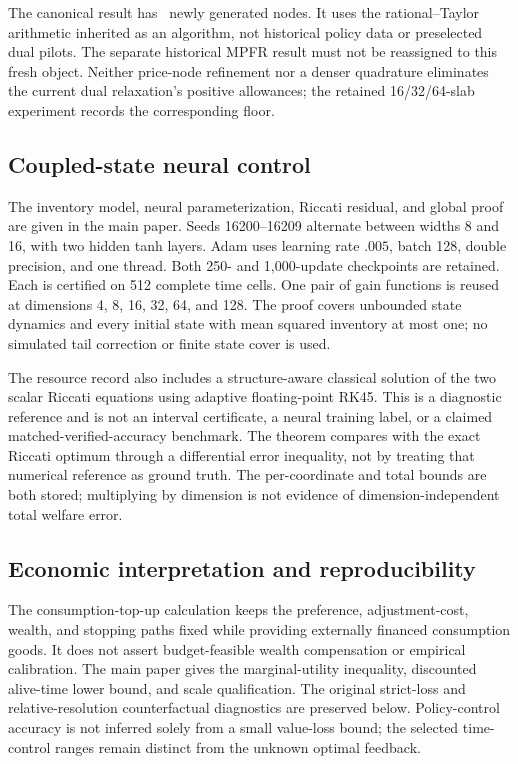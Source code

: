 The canonical result has \RFreshNodes\ newly generated nodes. It uses the rational--Taylor arithmetic inherited as an algorithm, not historical policy data or preselected dual pilots. The separate historical MPFR result must not be reassigned to this fresh object. Neither price-node refinement nor a denser quadrature eliminates the current dual relaxation's positive allowances; the retained 16/32/64-slab experiment records the corresponding floor.

\subsection{Coupled-state neural control}
The inventory model, neural parameterization, Riccati residual, and global proof are given in the main paper. Seeds 16200--16209 alternate between widths 8 and 16, with two hidden tanh layers. Adam uses learning rate $.005$, batch 128, double precision, and one thread. Both 250- and 1,000-update checkpoints are retained. Each is certified on 512 complete time cells. One pair of gain functions is reused at dimensions 4, 8, 16, 32, 64, and 128. The proof covers unbounded state dynamics and every initial state with mean squared inventory at most one; no simulated tail correction or finite state cover is used.


The resource record also includes a structure-aware classical solution of the two scalar Riccati equations using adaptive floating-point RK45. This is a diagnostic reference and is not an interval certificate, a neural training label, or a claimed matched-verified-accuracy benchmark. The theorem compares with the exact Riccati optimum through a differential error inequality, not by treating that numerical reference as ground truth. The per-coordinate and total bounds are both stored; multiplying by dimension is not evidence of dimension-independent total welfare error.



\subsection{Economic interpretation and reproducibility}
The consumption-top-up calculation keeps the preference, adjustment-cost, wealth, and stopping paths fixed while providing externally financed consumption goods. It does not assert budget-feasible wealth compensation or empirical calibration. The main paper gives the marginal-utility inequality, discounted alive-time lower bound, and scale qualification. The original strict-loss and relative-resolution counterfactual diagnostics are preserved below. Policy-control accuracy is not inferred solely from a small value-loss bound; the selected time-control ranges remain distinct from the unknown optimal feedback.


